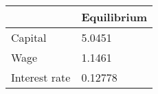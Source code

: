 \begin{tabular}{ll}
& Equilibrium \\ 
\hline 
Capital & 5.0451 \\ 
Wage & 1.1461 \\ 
Interest rate & 0.12778 \\ 
\hline 
\end{tabular}